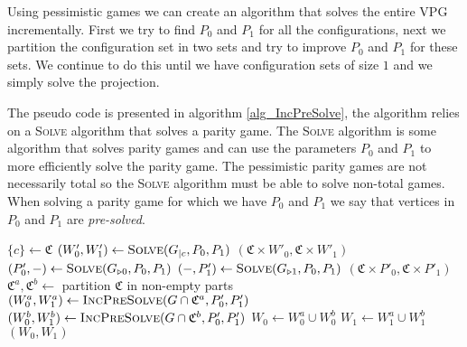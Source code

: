 
Using pessimistic games we can create an algorithm that solves the entire VPG incrementally. First we try to find $P_0$ and $P_1$ for all the configurations, next we partition the configuration set in two sets and try to improve $P_0$ and $P_1$ for these sets. We continue to do this until we have configuration sets of size $1$ and we simply solve the projection.

The pseudo code is presented in algorithm \ref{alg_IncPreSolve}, the algorithm relies on a \textsc{Solve} algorithm that solves a parity game. The \textsc{Solve} algorithm is some algorithm that solves parity games and can use the parameters $P_0$ and $P_1$ to more efficiently solve the parity game. The pessimistic parity games are not necessarily total so the \textsc{Solve} algorithm must be able to solve non-total games. When solving a parity game for which we have $P_0$ and $P_1$ we say that vertices in $P_0$ and $P_1$ are \textit{pre-solved}. 
\begin{algorithm}
	\caption{$\textsc{IncPreSolve}(G = (V,V_0,V_1, E, \Omega, \mathfrak{C}, \theta), P_0,P_1)$}\label{alg_IncPreSolve}
	\begin{algorithmic}[1]
		\State $\{c\} \gets \mathfrak{C}$
		\State $(W'_0,W'_1) \gets \textsc{Solve}(G_{|c}, P_0,P_1)$
		\State \Return $(\mathfrak{C} \times W'_0, \mathfrak{C} \times W'_1)$
		\EndIf
		\State $(P'_0,-) \gets \textsc{Solve}(G_{\triangleright0}, P_0, P_1)$
		\State $(-,P'_1) \gets \textsc{Solve}(G_{\triangleright1}, P_0, P_1)$
		\State \Return $(\mathfrak{C} \times P'_0, \mathfrak{C} \times P'_1)$
		\EndIf
		\State $\mathfrak{C}^a, \mathfrak{C}^b \gets $ partition $\mathfrak{C}$ in non-empty parts
		\State $(W_0^a, W_1^a) \gets \textsc{IncPreSolve}(G \cap \mathfrak{C}^a, P'_0,P'_1)$
		\State $(W_0^b, W_1^b) \gets \textsc{IncPreSolve}(G \cap \mathfrak{C}^b, P'_0,P'_1)$
		\State $W_0 \gets W_0^a \cup W_0^b$
		\State $W_1 \gets W_1^a \cup W_1^b$
		\State \Return $(W_0,W_1)$
	\end{algorithmic}
\end{algorithm}

